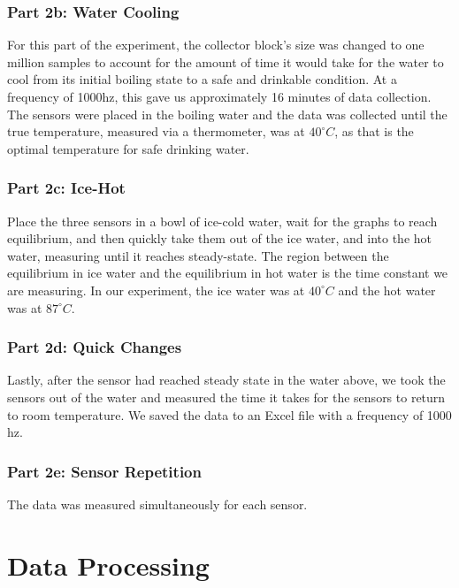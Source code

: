 \documentclass{article}
\begin{document}
\subsubsection{Part 2b: Water Cooling} %

For this part of the experiment, the collector block's size was changed to one million samples to account for the amount of time it would take for the water to cool from its initial boiling state to a safe and drinkable condition.  At a frequency of 1000hz, this gave us approximately 16 minutes of data collection.  The sensors were placed in the boiling water and the data was collected until the true temperature, measured via a thermometer, was at \(40^\circ C\), as that is the optimal temperature for safe drinking water.  

\subsubsection{Part 2c: Ice-Hot} %

Place the three sensors in a bowl of ice-cold water, wait for the graphs to reach equilibrium, and then quickly take them out of the ice water, and into the hot water, measuring until it reaches steady-state.  The region between the equilibrium in ice water and the equilibrium in hot water is the time constant we are measuring.  In our experiment, the ice water was at \(40^\circ C\) and the hot water was at \(87^\circ C\).  

\subsubsection{Part 2d: Quick Changes} %

Lastly, after the sensor had reached steady state in the water above, we took the sensors out of the water and measured the time it takes for the sensors to return to room temperature. We saved the data to an Excel file with a frequency of 1000 hz. 

\subsubsection{Part 2e: Sensor Repetition} %

The data was measured simultaneously for each sensor.  

\section{Data Processing}
\end{document}
